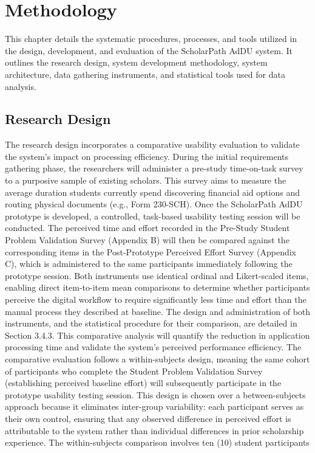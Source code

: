 \chapter{Methodology}
\label{ch:methodology}

This chapter details the systematic procedures, processes, and tools utilized in the design, development, and evaluation of the ScholarPath AdDU system. It outlines the research design, system development methodology, system architecture, data gathering instruments, and statistical tools used for data analysis.

\section{Research Design}

The research design incorporates a comparative usability evaluation to validate the system's impact on processing efficiency. During the initial requirements gathering phase, the researchers will administer a pre-study time-on-task survey to a purposive sample of existing scholars. This survey aims to measure the average duration students currently spend discovering financial aid options and routing physical documents (e.g., Form 230-SCH). Once the ScholarPath AdDU prototype is developed, a controlled, task-based usability testing session will be conducted. The perceived time and effort recorded in the Pre-Study Student Problem Validation Survey (Appendix B) will then be compared against the corresponding items in the Post-Prototype Perceived Effort Survey (Appendix C), which is administered to the same participants immediately following the prototype session. Both instruments use identical ordinal and Likert-scaled items, enabling direct item-to-item mean comparisons to determine whether participants perceive the digital workflow to require significantly less time and effort than the manual process they described at baseline. The design and administration of both instruments, and the statistical procedure for their comparison, are detailed in Section 3.4.3. This comparative analysis will quantify the reduction in application processing time and validate the system's perceived performance efficiency. The comparative evaluation follows a within-subjects design, meaning the same cohort of participants who complete the Student Problem Validation Survey (establishing perceived baseline effort) will subsequently participate in the prototype usability testing session. This design is chosen over a between-subjects approach because it eliminates inter-group variability: each participant serves as their own control, ensuring that any observed difference in perceived effort is attributable to the system rather than individual differences in prior scholarship experience. The within-subjects comparison involves ten (10) student participants
